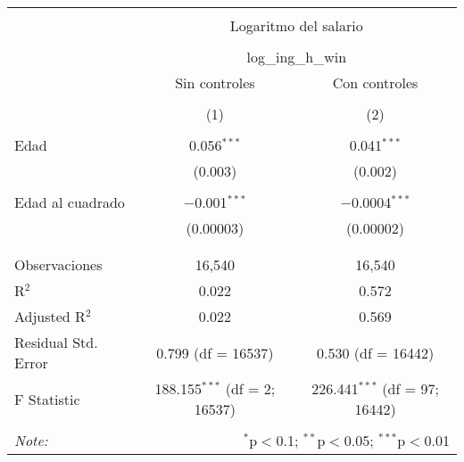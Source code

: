 
\begin{table}[!htbp] \centering 
  \caption{} 
  \label{} 
\begin{tabular}{@{\extracolsep{5pt}}lcc} 
\\[-1.8ex]\hline 
\hline \\[-1.8ex] 
 & \multicolumn{2}{c}{Logaritmo del salario} \\ 
\cline{2-3} 
\\[-1.8ex] & \multicolumn{2}{c}{log\_ing\_h\_win} \\ 
 & Sin controles & Con controles \\ 
\\[-1.8ex] & (1) & (2)\\ 
\hline \\[-1.8ex] 
 Edad & 0.056$^{***}$ & 0.041$^{***}$ \\ 
  & (0.003) & (0.002) \\ 
  & & \\ 
 Edad al cuadrado & $-$0.001$^{***}$ & $-$0.0004$^{***}$ \\ 
  & (0.00003) & (0.00002) \\ 
  & & \\ 
\hline \\[-1.8ex] 
Observaciones & 16,540 & 16,540 \\ 
R$^{2}$ & 0.022 & 0.572 \\ 
Adjusted R$^{2}$ & 0.022 & 0.569 \\ 
Residual Std. Error & 0.799 (df = 16537) & 0.530 (df = 16442) \\ 
F Statistic & 188.155$^{***}$ (df = 2; 16537) & 226.441$^{***}$ (df = 97; 16442) \\ 
\hline 
\hline \\[-1.8ex] 
\textit{Note:}  & \multicolumn{2}{r}{$^{*}$p$<$0.1; $^{**}$p$<$0.05; $^{***}$p$<$0.01} \\ 
\end{tabular} 
\end{table} 
